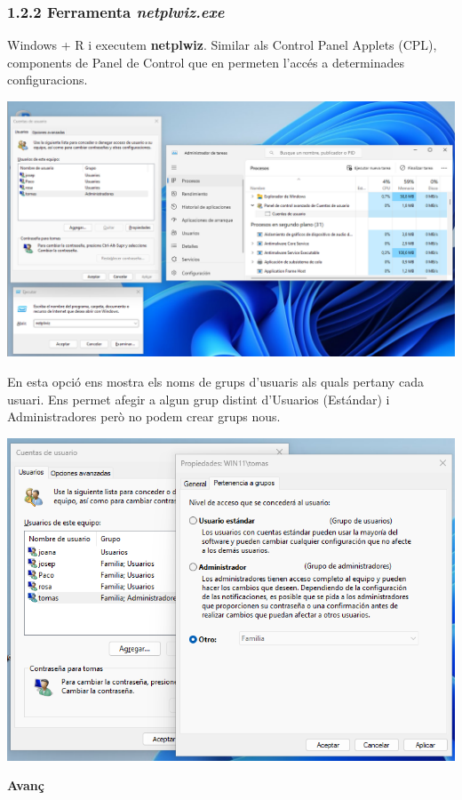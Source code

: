 \documentclass[
  a4paper,
]{article}
\begin{document}
\subsubsection{\texorpdfstring{1.2.2 Ferramenta
\emph{netplwiz.exe}}{1.2.2 Ferramenta netplwiz.exe}}\label{ferramenta-netplwiz.exe}

Windows + R i executem \textbf{netplwiz}. Similar als Control Panel
Applets (CPL), components de Panel de Control que en permeten l'accés a
determinades configuracions.

\includegraphics{png/3netplwiz.png}

En esta opció ens mostra els noms de grups d'usuaris als quals pertany
cada usuari. Ens permet afegir a algun grup distint d'Usuarios
(Estándar) i Administradores però no podem crear grups nous.

\includegraphics{png/propiedadesNetplwiz.png}

\textbf{Avanç}
\end{document}

